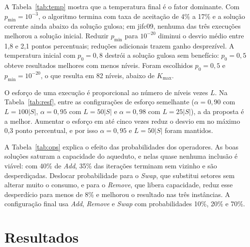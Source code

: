 \documentclass[11pt,a4paper]{article}
\begin{document}
A Tabela~\ref{tab:temp} mostra que a temperatura final é o fator dominante.
Com $p_{\min}=10^{-3}$, o algoritmo termina com taxa de aceitação de 4\% a
17\% e a solução corrente ainda abaixo da solução gulosa; em jifc09, nenhuma
das três execuções melhorou a solução inicial. Reduzir $p_{\min}$ para
$10^{-20}$ diminui o desvio médio entre 1{,}8 e 2{,}1 pontos percentuais;
reduções adicionais trazem ganho desprezível. A temperatura inicial com
$p_0=0{,}8$ destrói a solução gulosa sem benefício: $p_0=0{,}5$ obteve
resultados melhores com menos níveis. Foram escolhidos $p_0=0{,}5$ e
$p_{\min}=10^{-20}$, o que resulta em 82 níveis, abaixo de $K_{\max}$.

\begin{table}[htbp]
  \centering
  \caption{Desvio médio para o BKV (\%) em função de $\alpha$ e $L$, com
    $p_0=0{,}5$, $p_{\min}=10^{-20}$ e operadores 40/30/30.}
  \label{tab:resf}
  
\end{table}

O esforço de uma execução é proporcional ao número de níveis vezes $L$. Na
Tabela~\ref{tab:resf}, entre as configurações de esforço semelhante
($\alpha=0{,}90$ com $L=100|S|$, $\alpha=0{,}95$ com $L=50|S|$ e
$\alpha=0{,}98$ com $L=25|S|$), a da proposta é a melhor.
Aumentar o esforço em até cinco vezes reduz o desvio em no máximo 0{,}3 ponto
percentual, e
por isso $\alpha=0{,}95$ e $L=50|S|$ foram mantidos.

\begin{table}[htbp]
  \centering
  \caption{Desvio médio para o BKV (\%) por mistura de operadores, com 8
    sementes, e fração das iterações sem vizinho viável.}
  \label{tab:ops}
  
\end{table}

A Tabela~\ref{tab:ops} explica o efeito das probabilidades dos operadores.
As boas soluções saturam a capacidade do aqueduto, e nelas quase nenhuma
inclusão é viável: com 40\% de \emph{Add}, 35\% das iterações terminam sem
vizinho e são desperdiçadas. Deslocar probabilidade para o \emph{Swap}, que
substitui setores sem alterar muito o consumo, e para o \emph{Remove}, que
libera capacidade, reduz esse desperdício para menos de 8\% e melhorou o
resultado nas três instâncias. A configuração final usa \emph{Add},
\emph{Remove} e \emph{Swap} com probabilidades 10\%, 20\% e 70\%.

\section{Resultados}\label{sec:res}
\end{document}
